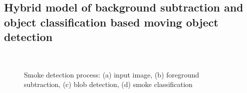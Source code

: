\subsection{Hybrid model of background subtraction and object classification based moving object detection}
\begin{figure}
\centering
{}
\\
\caption{Smoke detection process: (a) input image, (b) foreground subtraction, (c) blob detection, (d) smoke classification }
\label{fig:bgmethod}
\end{figure}
